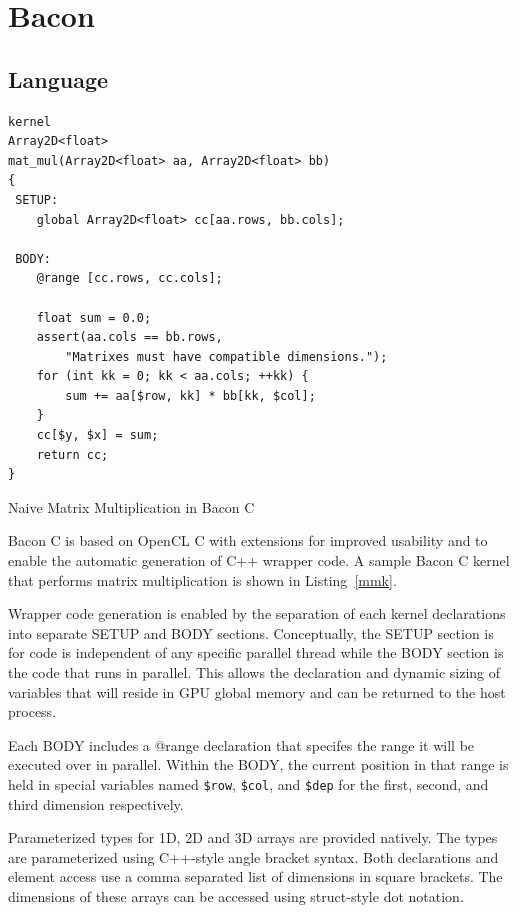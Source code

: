 \documentclass{llncs}
\begin{document}
\section{Bacon}
\subsection{Language}

\begin{listing}[tb]
\begin{verbatim}
kernel
Array2D<float>
mat_mul(Array2D<float> aa, Array2D<float> bb) 
{
 SETUP:
    global Array2D<float> cc[aa.rows, bb.cols];

 BODY:
    @range [cc.rows, cc.cols];

    float sum = 0.0;
    assert(aa.cols == bb.rows, 
        "Matrixes must have compatible dimensions.");
    for (int kk = 0; kk < aa.cols; ++kk) {
        sum += aa[$row, kk] * bb[kk, $col];
    }
    cc[$y, $x] = sum;
    return cc;
}
\end{verbatim}
\caption{Naive Matrix Multiplication in Bacon C}\label{mmk}
\end{listing}

Bacon C is based on OpenCL C with extensions for improved usability
and to enable the automatic generation of C++ wrapper code. A sample
Bacon C kernel that performs matrix multiplication is shown in
Listing~\ref{mmk}.

Wrapper code generation is enabled by the separation of each kernel
declarations into separate SETUP and BODY sections. Conceptually, the
SETUP section is for code is independent of any specific parallel
thread while the BODY section is the code that runs in parallel. This
allows the declaration and dynamic sizing of variables that will
reside in GPU global memory and can be returned to the host process.

Each BODY includes a @range declaration that specifes the range it
will be executed over in parallel. Within the BODY, the current
position in that range is held in special variables named {\tt\$row},
{\tt\$col}, and {\tt\$dep} for the first, second, and third dimension
respectively.

Parameterized types for 1D, 2D and 3D arrays are provided
natively. The types are parameterized using C++-style angle bracket
syntax. Both declarations and element access use a comma separated
list of dimensions in square brackets. The dimensions of these arrays
can be accessed using struct-style dot notation.
\end{document}
